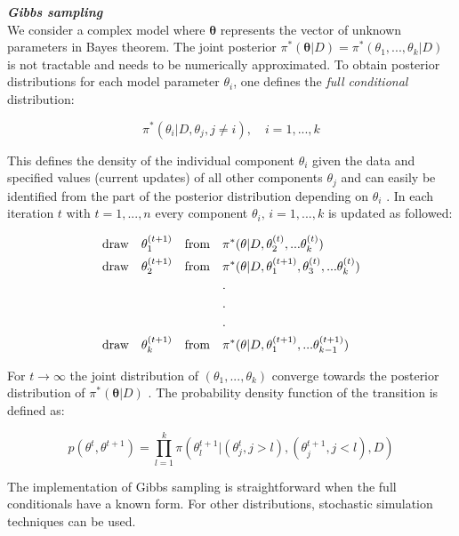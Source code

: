 \textbf{\textit{Gibbs sampling}}\\

We consider a complex model where $\bm{\theta}$ represents the vector of unknown parameters in Bayes theorem. The joint posterior $\pi^*(\bm{\theta}|D)=\pi^*(\theta_1,...,\theta_k|D)$ is not tractable and needs to be numerically approximated. To obtain posterior distributions for each model parameter $\theta_i$, one defines the \emph{full conditional} distribution:

\begin{equation}
\pi^*(\theta_i|D,\theta_j,j\neq{}i), \quad i=1,...,k
\end{equation}

This defines the density of the individual component $\theta_i$ given the data and specified values (current updates) of all other components $\theta_j$ \cite{Geman1984} and can easily be identified from the part of the posterior distribution depending on $\theta_i$ \citep{Bernardo2000}. In each iteration $t$ with $t=1,...,n$ every component $\theta_i,\,{}i=1,...,k$ is updated as followed:

\begin{align*}
\textnormal{draw} \quad  \theta_1^{(t+1)} \quad \textnormal{from} \quad & \pi^*(\theta|D, \theta_2^{(t)},...\theta_k^{(t)})\\
\textnormal{draw} \quad  \theta_2^{(t+1)} \quad \textnormal{from} \quad & \pi^*(\theta|D, \theta_1^{(t+1)},\theta_3^{(t)},...\theta_k^{(t)})\\
&.\\
&.\\
&.\\
\textnormal{draw} \quad  \theta_k^{(t+1)} \quad \textnormal{from}  \quad& \pi^*(\theta|D, \theta_1^{(t+1)},...\theta_{k-1}^{(t+1)})
\end{align*}

For $t\rightarrow{}\infty$ the joint distribution of $(\theta_1,...,\theta_k)$ converge towards the posterior distribution of $\pi^*(\bm{\theta}|D)$ \citep{Roberts1994, Geman1984}. The probability density function of the transition is defined as:

\begin{equation}
p(\theta^t,\theta^{t+1})=\prod_{l=1}^k{}\pi(\theta_l^{t+1}|(\theta_j^t,j>l),(\theta_j^{t+1},j<l),D)
\end{equation}

The implementation of Gibbs sampling is straightforward when the full conditionals have a known form. For other distributions, stochastic simulation techniques can be used.\\


